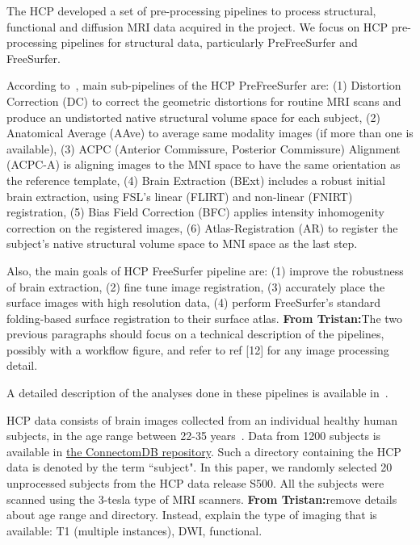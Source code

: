 \documentclass[a4paper,num-refs]{oup-contemporary}
\newcommand{\tristan}[1]{\color{blue}\textbf{From Tristan:}#1\color{black}}
\begin{document}
The HCP developed a set of pre-processing pipelines to process structural,
functional and diffusion MRI data acquired in the project. We focus on HCP
pre-processing pipelines for structural data, particularly PreFreeSurfer
and FreeSurfer. 

According to~\cite{glasser2013}, main sub-pipelines of the HCP PreFreeSurfer are:
(1) Distortion Correction (DC) 
to correct the geometric distortions for routine MRI scans 
and produce an undistorted native structural volume space for each subject,
(2) Anatomical Average (AAve) to average same modality images (if more than one is available),
(3) ACPC (Anterior Commissure, Posterior Commissure) Alignment (ACPC-A) 
is aligning images to the MNI space to have the same orientation as 
the reference template,
(4) Brain Extraction (BExt) includes a robust initial brain extraction, using FSL's linear (FLIRT) 
and non-linear (FNIRT) registration, 
(5) Bias Field Correction (BFC) applies intensity inhomogenity correction on the registered images, 
(6) Atlas-Registration (AR) to register the subject's native structural volume space to MNI space as the last step.

Also, the main goals of HCP FreeSurfer pipeline are:
(1) improve the robustness of brain extraction,
(2) fine tune image registration,
(3) accurately place the surface images with high resolution data,
(4) perform FreeSurfer's standard folding-based surface registration 
to their surface atlas.
\tristan{The two previous paragraphs should focus on a technical description of the pipelines, 
possibly with a workflow figure, 
and refer to ref [12] for any image processing detail.}

A detailed description of the analyses done in these
pipelines is available in~\cite{glasser2013}. 

HCP data consists of brain images collected from an individual healthy human subjects, 
in the age range between 22-35 years~\cite{van2013wu}. Data from 1200 subjects 
is available in \href{https://db.humanconnectome.org}{the ConnectomDB repository}. 
Such a directory containing the HCP data is denoted by the term ``subject".
In this paper, we randomly selected 20 unprocessed subjects from 
the HCP data release S500. All the subjects were scanned using the 3-tesla 
type of MRI scanners.
\tristan{remove details about age range and directory. Instead, explain the type of
imaging that is available: T1 (multiple instances), DWI, functional.}
\end{document}
